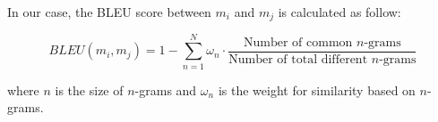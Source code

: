 In our case, the BLEU score between $m_i$ and $m_j$ is calculated as follow:

\begin{equation}
  BLEU(m_i, m_j) = 1 - \sum_{n=1}^{N} \omega_n \cdot \frac{\mbox{Number of common } n\mbox{-grams}}{\mbox{Number of total different } n\mbox{-grams}}
  \label{eq3.3.1:bleu_score}
\end{equation}

where $n$ is the size of $n$-grams and $\omega_n$ is the weight for similarity based on $n$-grams.
